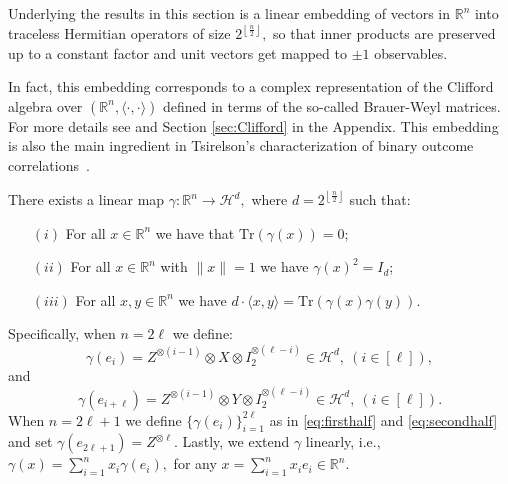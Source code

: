 \documentclass{siamart}
\begin{document}
{{Underlying the results in this section is  a linear embedding of  vectors in ${\mathbb{R}}^n$  into  traceless Hermitian operators of size $ 2^{\left\lfloor \frac{n}{2}\right \rfloor},$ so that inner products are preserved up to a constant factor and unit vectors get mapped to $\pm 1$ observables.

In fact, this embedding corresponds to a   complex  representation of the Clifford algebra over $({\mathbb{R}}^n,{\langle} \cdot,\cdot{\rangle})$ defined in terms of the so-called  {Brauer-Weyl} matrices. For more details see \cite{GW} and Section \ref{sec:Clifford} in the Appendix.
This embedding is also the main  ingredient in Tsirelson's characterization of binary outcome correlations~\cite{TS87}.
\vspace{0.1cm} 

\begin{theorem}\label{thm:cliffordalgebramain}
There exists a linear map $\gamma: {\mathbb{R}}^n\rightarrow {\mathcal{H}}^d,  $ where    $d=2^{\left\lfloor \frac{n}{2}\right \rfloor}$   such that:
\begin{itemize}
\item[$(i)$] For all $x\in {\mathbb{R}}^n$ we have that ${\mathrm{Tr}}\left(\gamma(x)\right)=0$;
\item[$(ii)$]   For all $x\in {\mathbb{R}}^n$ with {$\|x\|=1$}  we have $\gamma(x)^2=I_d$;
\item[$(iii)$] For all $x,y\in {\mathbb{R}}^n$  we have  $d\cdot {\langle} x,y{\rangle}={\mathrm{Tr}}\left( \gamma(x)\gamma(y)\right)$.
\end{itemize}
\end{theorem}
\medskip

Specifically, when   $n=2\ell$ we define:
 \begin{equation}\label{eq:firsthalf}
 \gamma(e_i)= Z^{\otimes(i-1)}\otimes X\otimes I_2^{\otimes (\ell-i)} \in {\mathcal{H}}^d,  \ (i\in [\ell]),
 \end{equation}
 and
 \begin{equation}\label{eq:secondhalf}
 \gamma(e_{i+\ell})= Z^{\otimes(i-1)}\otimes Y\otimes I_2^{\otimes (\ell-i)}\in {\mathcal{H}}^d, \ (i\in [\ell]).
\end{equation}
When  $n=2\ell+1$ we define $\{\gamma(e_i)\}_{i=1}^{2\ell}$ as in \eqref{eq:firsthalf} and \eqref{eq:secondhalf}  and  set $\gamma(e_{2\ell+1})= Z^{\otimes \ell}.$  Lastly, we extend $\gamma$ linearly, i.e.,  $\gamma(x)=\sum_{i=1}^nx_i\gamma(e_i),$ for any  $x=\sum_{i=1}^n x_i e_i\in {\mathbb{R}}^n$.

}}
\end{document}
